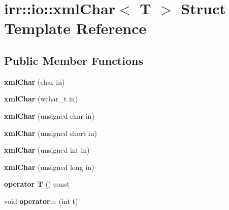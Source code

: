 \hypertarget{structirr_1_1io_1_1xmlChar}{}\section{irr\+:\+:io\+:\+:xml\+Char$<$ T $>$ Struct Template Reference}
\label{structirr_1_1io_1_1xmlChar}
\subsection*{Public Member Functions}
\begin{DoxyCompactItemize}
\item 
{\bfseries xml\+Char} (char in)\hypertarget{structirr_1_1io_1_1xmlChar_a7e2e2fb1c425f31ce60a61b4c516d13f}{}\label{structirr_1_1io_1_1xmlChar_a7e2e2fb1c425f31ce60a61b4c516d13f}

\item 
{\bfseries xml\+Char} (wchar\+\_\+t in)\hypertarget{structirr_1_1io_1_1xmlChar_a577cfdfe6ddfa4e37a55804ea054885c}{}\label{structirr_1_1io_1_1xmlChar_a577cfdfe6ddfa4e37a55804ea054885c}

\item 
{\bfseries xml\+Char} (unsigned char in)\hypertarget{structirr_1_1io_1_1xmlChar_a4f9f63293cadcd44c7cd8bc7e1a098f7}{}\label{structirr_1_1io_1_1xmlChar_a4f9f63293cadcd44c7cd8bc7e1a098f7}

\item 
{\bfseries xml\+Char} (unsigned short in)\hypertarget{structirr_1_1io_1_1xmlChar_a2339ce7c1d201c397805a37f47589efa}{}\label{structirr_1_1io_1_1xmlChar_a2339ce7c1d201c397805a37f47589efa}

\item 
{\bfseries xml\+Char} (unsigned int in)\hypertarget{structirr_1_1io_1_1xmlChar_a54a243bd9821e6677d9be9106deaf0cf}{}\label{structirr_1_1io_1_1xmlChar_a54a243bd9821e6677d9be9106deaf0cf}

\item 
{\bfseries xml\+Char} (unsigned long in)\hypertarget{structirr_1_1io_1_1xmlChar_ae7474c9384d8807f8fcd029cc238e2c2}{}\label{structirr_1_1io_1_1xmlChar_ae7474c9384d8807f8fcd029cc238e2c2}

\item 
{\bfseries operator T} () const \hypertarget{structirr_1_1io_1_1xmlChar_a676ddac484d71f58c34498bf2d71bcf7}{}\label{structirr_1_1io_1_1xmlChar_a676ddac484d71f58c34498bf2d71bcf7}

\item 
void {\bfseries operator=} (int t)\hypertarget{structirr_1_1io_1_1xmlChar_ab89d0f74b935fb69090c5da5e504e78b}{}\label{structirr_1_1io_1_1xmlChar_ab89d0f74b935fb69090c5da5e504e78b}

\end{DoxyCompactItemize}
